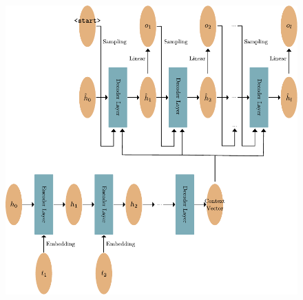 \documentclass[]{marticle}
\begin{document}
\begin{figure}[!h] 
\begin{center}
\includegraphics{recurrent_context.pdf}
\caption{} 
\end{center}
\end{figure}
\end{document}
